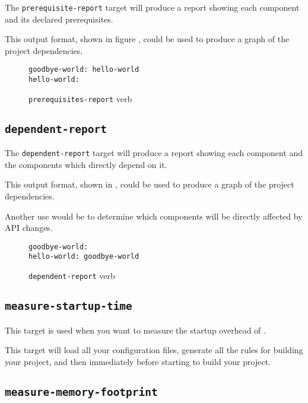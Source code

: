 The \texttt{prerequisite-report} target will produce a report showing
each component and its declared prerequisites.

This output format, shown in figure
, could be used to produce a
graph of the project dependencies.

\begin{figure}[tbh]
\hrulefill
\begin{verbatim}
goodbye-world: hello-world
hello-world:
\end{verbatim}
\hrulefill
\caption{\texttt{prerequisites-report} verb}\label{usinglmsbw:prerequisites-verb}
\end{figure}


\subsection{\texttt{dependent-report}}

The \texttt{dependent-report} target will produce a report showing
each component and the components which directly depend on it.

This output format, shown in ,
could be used to produce a graph of the project dependencies.

Another use would be to determine which components will be directly
affected by API changes.

\begin{figure}[tbh]
\hrulefill
\begin{verbatim}
goodbye-world:
hello-world: goodbye-world
\end{verbatim}
\hrulefill
\caption{\texttt{dependent-report} verb}\label{usinglmsbw:dependents-verb}
\end{figure}


\subsection{\texttt{measure-startup-time}}\label{usinglmsbw:measure-startup-time}

This target is used when you want to measure the startup overhead of
\lmsbw.

This target will load all your configuration files, generate all the
rules for building your project, and then immediately before starting
to build your project.

\subsection{\texttt{measure-memory-footprint}}

